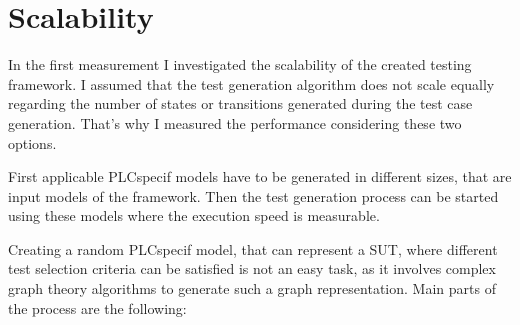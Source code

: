 
\section{Scalability}
\label{sec:scalability}

In the first measurement I investigated the scalability of the created testing framework. I assumed that the test generation algorithm does not scale equally regarding the number of states or transitions generated during the test case generation. That's why I measured the performance considering these two options.

First applicable PLCspecif models have to be generated in different sizes, that are input models of the framework. Then the test generation process can be started using these models where the execution speed is measurable.

Creating a random PLCspecif model, that can represent a SUT, where different test selection criteria can be satisfied is not an easy task, as it involves complex graph theory algorithms to generate such a graph representation. Main parts of the process are the following:

